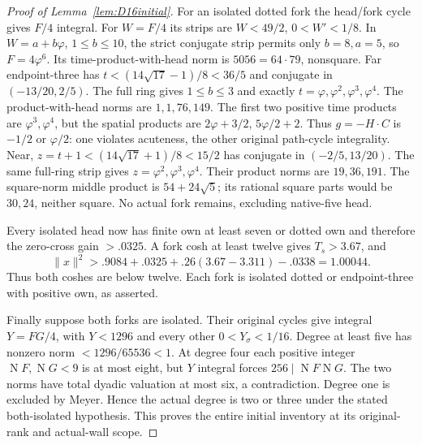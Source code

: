 \documentclass[11pt]{article}
\newcommand{\N}{\operatorname{N}}
\begin{document}
\begin{proof}[Proof of Lemma~\ref{lem:D16initial}]
For an isolated dotted fork the head/fork cycle gives $F/4$ integral.
For $W=F/4$ its strips are $W<49/2$, $0<W'<1/8$.
In $W=a+b\varphi$, $1\le b\le10$, the strict conjugate strip
permits only $b=8,a=5$, so $F=4\varphi^6$.
Its time-product-with-head norm is $5056=64\cdot79$, nonsquare.
Far endpoint-three has
$t<(14\sqrt{17}-1)/8<36/5$ and conjugate in $(-13/20,2/5)$.
The full ring gives $1\le b\le3$ and exactly
$t=\varphi,\varphi^2,\varphi^3,\varphi^4$.
The product-with-head norms are $1,1,76,149$.
The first two positive time products are $\varphi^3,\varphi^4$,
but the spatial products are $2\varphi+3/2$, $5\varphi/2+2$.
Thus $g=-H\cdot C$ is $-1/2$ or $\varphi/2$:
one violates acuteness, the other original path-cycle integrality.
Near, $z=t+1<(14\sqrt{17}+1)/8<15/2$ has conjugate in
$(-2/5,13/20)$. The same full-ring strip gives
$z=\varphi^2,\varphi^3,\varphi^4$.
Their product norms are $19,36,191$.
The square-norm middle product is $54+24\sqrt5$; its rational
square parts would be $30,24$, neither square.
No actual fork remains, excluding native-five head.

Every isolated head now has finite own at least seven or dotted own
and therefore the zero-cross gain $>.0325$.
A fork cosh at least twelve gives $T_s>3.67$, and
\[
 \|x\|^2>.9084+.0325+.26(3.67-3.311)-.0338=1.00044 .
\]
Thus both coshes are below twelve. Each fork is isolated dotted
or endpoint-three with positive own, as asserted.

Finally suppose both forks are isolated. Their original cycles give
integral $Y=FG/4$, with $Y<1296$ and every other $0<Y_\sigma<1/16$.
Degree at least five has nonzero norm $<1296/65536<1$.
At degree four each positive integer $\N F,\N G<9$ is at most eight,
but $Y$ integral forces $256\mid\N F\N G$.
The two norms have total dyadic valuation at most six, a contradiction.
Degree one is excluded by Meyer. Hence the actual degree is two or
three under the stated both-isolated hypothesis. This proves the
entire initial inventory at its original-rank and actual-wall scope.
\end{proof}
\end{document}
